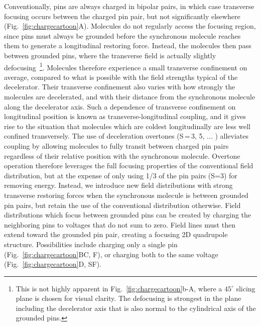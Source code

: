 \documentclass[%
 reprint,
 amsmath,amssymb,
 aps,
prl,
]{revtex4-1}
\begin{document}
Conventionally, pins are always charged in bipolar pairs, in which case transverse focusing occurs between the charged pin pair, but not significantly elsewhere (Fig.~\ref{fig:chargecartoon}A).
Molecules do not regularly access the focusing region, since pins must always be grounded before the synchronous molecule reaches them to generate a longitudinal restoring force.
Instead, the molecules then pass between grounded pins, where the transverse field is actually slightly defocusing~\footnote{This is not highly apparent in Fig.~\ref{fig:chargecartoon}b-A, where a $45^\circ$ slicing plane is chosen for visual clarity. The defocusing is strongest in the plane including the decelerator axis that is also normal to the cylindrical axis of the grounded pins.}.
Molecules therefore experience a small transverse confinement on average, compared to what is possible with the field strengths typical of the decelerator. 
Their transverse confinement also varies with how strongly the molecules are decelerated, and with their distance from the synchronous molecule along the decelerator axis. 
Such a dependence of transverse confinement on longitudinal position is known as transverse-longitudinal coupling, and it gives rise to the situation that molecules which are coldest longitudinally are less well confined transversely.
The use of deceleration overtones (S\,=\,3, 5, ... ) \cite{VanDeMeerakker2005a} alleviates	coupling by allowing molecules to fully transit between charged pin pairs regardless of their relative position with the synchronous molecule. 
Overtone operation therefore leverages the full focusing properties of the conventional field distribution, but at the expense of only using 1/3 of the pin pairs (S=3) for removing energy.
Instead, we introduce new field distributions with strong transverse restoring forces when the synchronous molecule is between grounded pin pairs, but retain the use of the conventional distribution otherwise.
Field distributions which focus between grounded pins can be created by charging the neighboring pins to voltages that do not sum to zero.
Field lines must then extend toward the grounded pin pair, creating a focusing 2D quadrupole structure.
Possibilities include charging only a single pin (Fig.~\ref{fig:chargecartoon}BC, F), or charging both to the same voltage (Fig.~\ref{fig:chargecartoon}D, SF).
\end{document}
